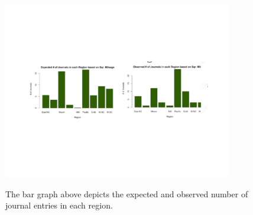 \documentclass[12pt, letterpaper]{article}
\begin{document}
\begin{figure}[h]
\begin{center}
\includegraphics[width=10cm]{Regions2BarGraph.pdf}
\label{fig: Continent Bar Graph}
\caption{The bar graph above depicts the expected and observed number of journal entries in each region.}
\end{center}
\end{figure}


\pagebreak
\end{document}

